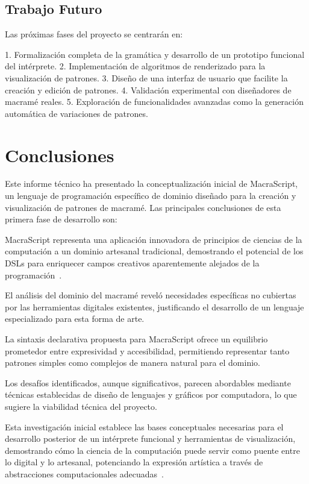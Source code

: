 \documentclass[12pt,a4paper]{report}
\begin{document}
\section{Trabajo Futuro}
Las próximas fases del proyecto se centrarán en:

1. Formalización completa de la gramática y desarrollo de un prototipo funcional del intérprete.
2. Implementación de algoritmos de renderizado para la visualización de patrones.
3. Diseño de una interfaz de usuario que facilite la creación y edición de patrones.
4. Validación experimental con diseñadores de macramé reales.
5. Exploración de funcionalidades avanzadas como la generación automática de variaciones de patrones.

\chapter{Conclusiones}

Este informe técnico ha presentado la conceptualización inicial de MacraScript, un lenguaje de programación específico de dominio diseñado para la creación y visualización de patrones de macramé. Las principales conclusiones de esta primera fase de desarrollo son:

MacraScript representa una aplicación innovadora de principios de ciencias de la computación a un dominio artesanal tradicional, demostrando el potencial de los DSLs para enriquecer campos creativos aparentemente alejados de la programación~\cite{rochford2019}.

El análisis del dominio del macramé reveló necesidades específicas no cubiertas por las herramientas digitales existentes, justificando el desarrollo de un lenguaje especializado para esta forma de arte.

La sintaxis declarativa propuesta para MacraScript ofrece un equilibrio prometedor entre expresividad y accesibilidad, permitiendo representar tanto patrones simples como complejos de manera natural para el dominio.

Los desafíos identificados, aunque significativos, parecen abordables mediante técnicas establecidas de diseño de lenguajes y gráficos por computadora, lo que sugiere la viabilidad técnica del proyecto.

Esta investigación inicial establece las bases conceptuales necesarias para el desarrollo posterior de un intérprete funcional y herramientas de visualización, demostrando cómo la ciencia de la computación puede servir como puente entre lo digital y lo artesanal, potenciando la expresión artística a través de abstracciones computacionales adecuadas~\cite{owen1997}.
\end{document}
